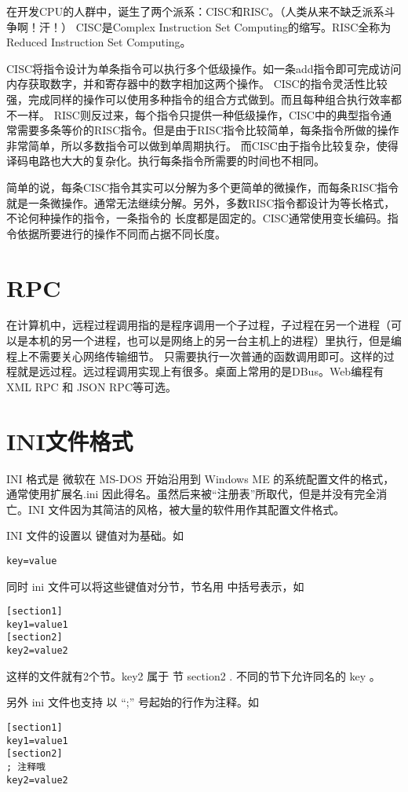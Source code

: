 在开发CPU的人群中，诞生了两个派系：CISC和RISC。（人类从来不缺乏派系斗争啊！汗！）
CISC是{}Complex Instruction Set Computing{}的缩写。RISC全称为{}Reduced Instruction Set Computing{}。

CISC{}将指令设计为单条指令可以执行多个低级操作。如一条add指令即可完成访问内存获取数字，并和寄存器中的数字相加这两个操作。
CISC的指令灵活性比较强，完成同样的操作可以使用多种指令的组合方式做到。而且每种组合执行效率都不一样。
RISC则反过来，每个指令只提供一种低级操作，CISC中的典型指令通常需要多条等价的RISC指令。但是由于RISC指令比较简单，每条指令所做的操作非常简单，所以多数指令可以做到单周期执行。
而CISC由于指令比较复杂，使得译码电路也大大的复杂化。执行每条指令所需要的时间也不相同。

简单的说，每条CISC指令其实可以分解为多个更简单的微操作，而每条RISC指令就是一条微操作。通常无法继续分解。另外，多数RISC指令都设计为等长格式，不论何种操作的指令，一条指令的
长度都是固定的。CISC通常使用变长编码。指令依据所要进行的操作不同而占据不同长度。

\section{RPC}\label{FAQ:RPC}

在计算机中，远程过程调用指的是程序调用一个子过程，子过程在另一个进程（可以是本机的另一个进程，也可以是网络上的另一台主机上的进程）里执行，但是编程上不需要关心网络传输细节。
只需要执行一次普通的函数调用即可。这样的过程就是远过程。远过程调用实现上有很多。桌面上常用的是DBus。Web编程有XML RPC 和 JSON RPC等可选。

\section{INI文件格式}\label{FAQ:INI}

INI 格式是 微软在 MS-DOS 开始沿用到 Windows ME 的系统配置文件的格式，通常使用扩展名.ini 因此得名。虽然后来被“注册表”所取代，但是并没有完全消亡。INI 文件因为其简洁的风格，被大量的软件用作其配置文件格式。

INI 文件的设置以 键值对为基础。如

\begin{verbatim}
key=value
\end{verbatim}

同时 ini 文件可以将这些键值对分节，节名用 中括号表示，如

\begin{verbatim}
[section1]
key1=value1
[section2]
key2=value2
\end{verbatim}

这样的文件就有2个节。key2 属于 节 section2 . 不同的节下允许同名的 key 。


另外 ini 文件也支持 以 “;” 号起始的行作为注释。如


\begin{verbatim}
[section1]
key1=value1
[section2]
; 注释哦
key2=value2
\end{verbatim}

